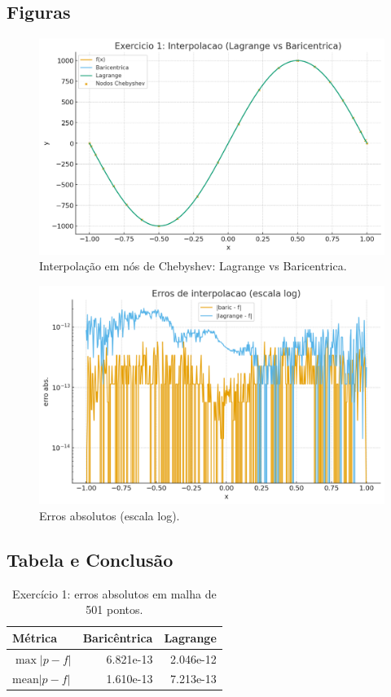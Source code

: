 \documentclass[11pt,a4paper]{article}
\begin{document}
\subsection*{Figuras}
\begin{figure}[h!]\centering
\includegraphics[width=0.85\linewidth]{figures/ex1_interp.png}
\caption{Interpolação em nós de Chebyshev: Lagrange vs Baricentrica.}
\label{fig:ex1_interp}
\end{figure}
\begin{figure}[h!]\centering
\includegraphics[width=0.75\linewidth]{figures/ex1_errors.png}
\caption{Erros absolutos (escala log).}
\label{fig:ex1_err}
\end{figure}

\subsection*{Tabela e Conclusão}
\begin{table}[h!]\centering
\caption{Exercício 1: erros absolutos em malha de 501 pontos.}
\label{tab:ex1}
\begin{tabular}{lrr}
\toprule
Métrica & Baricêntrica & Lagrange \\
\midrule
$\max|p-f|$ & 6.821e-13 & 2.046e-12 \\
$\mathrm{mean}|p-f|$ & 1.610e-13 & 7.213e-13 \\
\bottomrule
\end{tabular}
\end{table}
\end{document}
